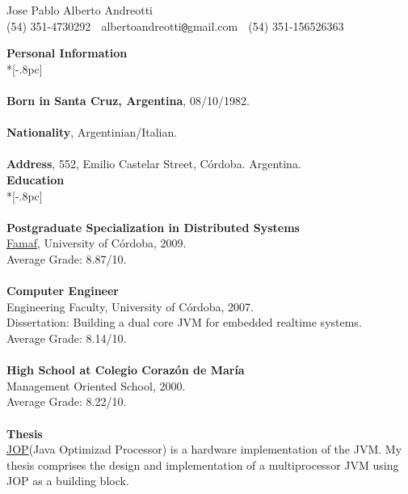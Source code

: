 \documentclass[a4paper,11pt,english]{article}
\begin{document}
\begin{center}
{\Large Jose Pablo Alberto Andreotti} \\[.5pc]
(54) 351-4730292 $\;$ albertoandreotti\verb|@|gmail.com $\;$ (54) 351-156526363 \\[3pc]
\end{center}
{\large \bf Personal Information} \\*[-.8pc]
\underline{\hspace{6in}} \\
\\
{\bf Born in Santa Cruz, Argentina}, 08/10/1982.\\
\\
{\bf Nationality}, Argentinian/Italian.\\
\\
{\bf Address}, 552, Emilio Castelar Street, C\'ordoba. Argentina.\\

{\large \bf Education} \\*[-.8pc]
\underline{\hspace{6in}} \\
\\
{\bf Postgraduate Specialization in Distributed Systems}\\
\href{http://www.famaf.unc.edu.ar/}{Famaf}, University of C\'ordoba, 2009. \\
Average Grade: 8.87/10. \\
\\
{\bf Computer Engineer}\\
Engineering Faculty, University of C\'ordoba, 2007.\\
Dissertation: Building a dual core JVM for embedded realtime systems.\\
Average Grade: 8.14/10. \\
\\
{\bf High School at Colegio Coraz\'on de Mar\'ia}\\
Management Oriented School, 2000.\\
Average Grade: 8.22/10.\\
\\
{\bf Thesis} \\
\href{http://www.jopdesign.com}{JOP}(Java Optimizad Processor) is a hardware implementation of the JVM. My thesis 
comprises the design and implementation of a multiprocessor JVM using JOP as a building block.\\
\end{document}
